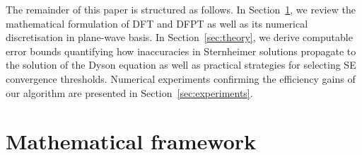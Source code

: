 \documentclass[hidelinks,onefignum,onetabnum]{siamart250211}
\begin{document}
The remainder of this paper is structured as follows.
In Section~\ref{sec:mathematical}, we review the mathematical formulation of DFT and DFPT
as well as its numerical discretisation in plane-wave basis.
In Section~\ref{sec:theory}, we derive computable error bounds quantifying how
inaccuracies in Sternheimer solutions propagate to the solution of the Dyson
equation as well as practical strategies for selecting SE convergence thresholds.
Numerical experiments confirming the efficiency gains of our algorithm
are presented in Section~\ref{sec:experiments}.


%
%
%

\section{Mathematical framework}
\label{sec:mathematical}
%
%
%
%
\end{document}
